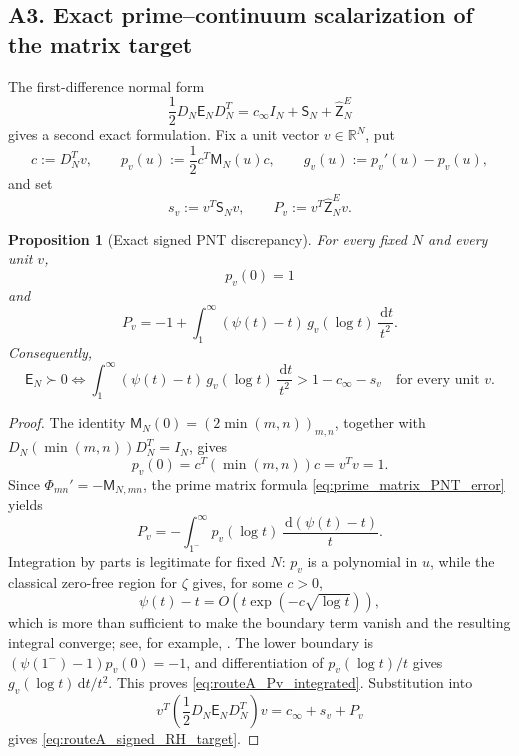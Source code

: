 \documentclass[11pt]{amsart}
\numberwithin{equation}{section}
\theoremstyle{plain}
\newtheorem{proposition}[theorem]{Proposition}
\theoremstyle{definition}
\theoremstyle{remark}
\newcommand{\E}{\mathsf E}
\newcommand{\dd}{\,\mathrm d}
\begin{document}
\subsection{A3. Exact prime--continuum scalarization of the matrix target}
\label{subsec:routeA_prime_scalar}

The first-difference normal form
\begin{equation}
\frac12D_N\E_ND_N^T
=
c_\infty I_N+\mathsf S_N+\widehat{\mathsf Z}_N^E
\label{eq:routeA_normal_form}
\end{equation}
gives a second exact formulation.  Fix a unit vector \(v\in\mathbb R^N\), put
\begin{equation}
c:=D_N^Tv,
\qquad
p_v(u):=\frac12c^T\mathsf M_N(u)c,
\qquad
g_v(u):=p_v'(u)-p_v(u),
\label{eq:routeA_pv_gv}
\end{equation}
and set
\begin{equation}
s_v:=v^T\mathsf S_Nv,
\qquad
P_v:=v^T\widehat{\mathsf Z}_N^Ev.
\label{eq:routeA_sv_Pv}
\end{equation}

\begin{proposition}[Exact signed PNT discrepancy]
\label{prop:routeA_signed_discrepancy}
For every fixed \(N\) and every unit \(v\),
\begin{equation}
p_v(0)=1
\label{eq:routeA_pv0}
\end{equation}
and
\begin{equation}
\boxed{
P_v
=
-1+
\int_1^\infty
(\psi(t)-t)\,
g_v(\log t)\,
\frac{\dd t}{t^2}.}
\label{eq:routeA_Pv_integrated}
\end{equation}
Consequently,
\begin{equation}
\boxed{
\E_N\succ0
\Longleftrightarrow
\int_1^\infty
(\psi(t)-t)\,
g_v(\log t)\,
\frac{\dd t}{t^2}
>
1-c_\infty-s_v
\quad\text{for every unit }v.}
\label{eq:routeA_signed_RH_target}
\end{equation}
\end{proposition}

\begin{proof}
The identity \(\mathsf M_N(0)=(2\min(m,n))_{m,n}\), together with
\(D_N(\min(m,n))D_N^T=I_N\), gives
\[
p_v(0)=c^T(\min(m,n))c=v^Tv=1.
\]
Since \(\Phi_{mn}'=-\mathsf M_{N,mn}\), the prime matrix formula
\eqref{eq:prime_matrix_PNT_error} yields
\[
P_v=-\int_{1^-}^{\infty}p_v(\log t)\,\frac{\dd(\psi(t)-t)}{t}.
\]
Integration by parts is legitimate for fixed \(N\): \(p_v\) is a polynomial in \(u\), while the
classical zero-free region for \(\zeta\) gives, for some \(c>0\),
\[
\psi(t)-t=O\!\left(t\exp(-c\sqrt{\log t})\right),
\]
which is more than sufficient to make the boundary term vanish and the resulting integral converge;
see, for example, \cite{Titchmarsh1986}.  The lower boundary is
\((\psi(1^-)-1)p_v(0)=-1\), and differentiation of \(p_v(\log t)/t\) gives
\(g_v(\log t)\dd t/t^2\).  This proves \eqref{eq:routeA_Pv_integrated}.  Substitution into
\[
v^T\left(\frac12D_N\E_ND_N^T\right)v
=c_\infty+s_v+P_v
\]
gives \eqref{eq:routeA_signed_RH_target}.
\end{proof}
\end{document}

